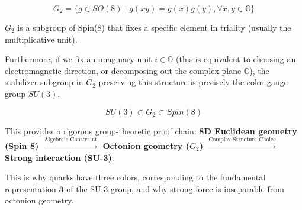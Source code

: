 \[G_2 = \{ g \in SO(8) \mid g(xy) = g(x)g(y), \forall x,y \in \mathbb{O} \}\]

$G_2$ is a subgroup of Spin(8) that fixes a specific element in triality (usually the multiplicative unit).

Furthermore, if we fix an imaginary unit $i \in \mathbb{O}$ (this is equivalent to choosing an electromagnetic direction, or decomposing out the complex plane $\mathbb{C}$), the stabilizer subgroup in $G_2$ preserving this structure is precisely the color gauge group \textbf{$SU(3)$}.

\[SU(3) \subset G_2 \subset Spin(8)\]

This provides a rigorous group-theoretic proof chain:
\textbf{8D Euclidean geometry (Spin 8) $\xrightarrow{\text{Algebraic Constraint}}$ Octonion geometry ($G_2$) $\xrightarrow{\text{Complex Structure Choice}}$ Strong interaction (SU-3)}.

This is why quarks have three colors, corresponding to the fundamental representation $\mathbf{3}$ of the SU-3 group, and why strong force is inseparable from octonion geometry.
